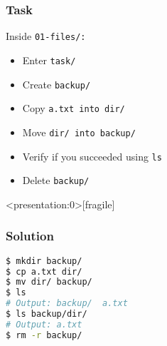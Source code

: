 \begin{frame}
\frametitle{Task}
Inside \tt{01-files/}:
\begin{itemize}
    \item Enter \tt{task/}
    \item Create \tt{backup/}
    \item Copy \tt{a.txt} into \tt{dir/}
    \item Move \tt{dir/} into \tt{backup/}
    \item Verify if you succeeded using \tt{ls}
    \item Delete \tt{backup/}
\end{itemize}
\end{frame}

\begin{frame}<presentation:0>[fragile]
\frametitle{Solution}
\begin{lstlisting}[language=bash]
$ mkdir backup/
$ cp a.txt dir/
$ mv dir/ backup/
$ ls
# Output: backup/  a.txt
$ ls backup/dir/
# Output: a.txt
$ rm -r backup/
\end{lstlisting}
\end{frame}

